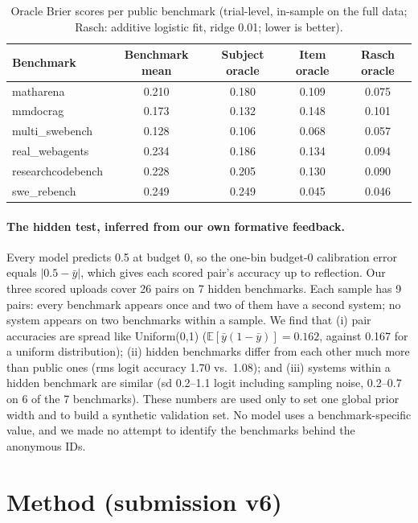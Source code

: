 \documentclass{article}
\begin{document}
\begin{table}[h]
  \caption{Oracle Brier scores per public benchmark (trial-level, in-sample on the full data; Rasch: additive logistic fit, ridge
  0.01; lower is better).}
  \label{tab:oracle}
  \centering\small
  \begin{tabular}{lcccc}
    \toprule
    Benchmark & Benchmark mean & Subject oracle & Item oracle & Rasch oracle \\
    \midrule
    matharena          & 0.210 & 0.180 & 0.109 & 0.075 \\
    mmdocrag           & 0.173 & 0.132 & 0.148 & 0.101 \\
    multi\_swebench    & 0.128 & 0.106 & 0.068 & 0.057 \\
    real\_webagents    & 0.234 & 0.186 & 0.134 & 0.094 \\
    researchcodebench  & 0.228 & 0.205 & 0.130 & 0.090 \\
    swe\_rebench       & 0.249 & 0.249 & 0.045 & 0.046 \\
    \bottomrule
  \end{tabular}
\end{table}

\paragraph{The hidden test, inferred from our own formative feedback.} Every model predicts 0.5 at budget 0, so the one-bin budget-0
calibration error equals $|0.5 - \bar y|$, which gives each scored pair's accuracy up to reflection. Our three scored uploads cover
26 pairs on 7 hidden benchmarks. Each sample has 9 pairs: every benchmark appears once and two of them have a second system; no system
appears on two benchmarks within a sample. We find that (i) pair accuracies are spread like Uniform(0,1)
($\mathbb{E}[\bar y(1-\bar y)] = 0.162$, against 0.167 for a uniform distribution); (ii) hidden benchmarks differ from each other much
more than public ones (rms logit accuracy 1.70 vs.\ 1.08); and (iii) systems within a hidden benchmark are similar (sd 0.2--1.1 logit
including sampling noise, 0.2--0.7 on 6 of the 7 benchmarks). These numbers are used only to set one global prior width and to build
a synthetic validation set. No model uses a benchmark-specific value, and we made no attempt to identify the benchmarks behind the
anonymous IDs.

\section{Method (submission v6)}
\label{sec:method}
\end{document}
